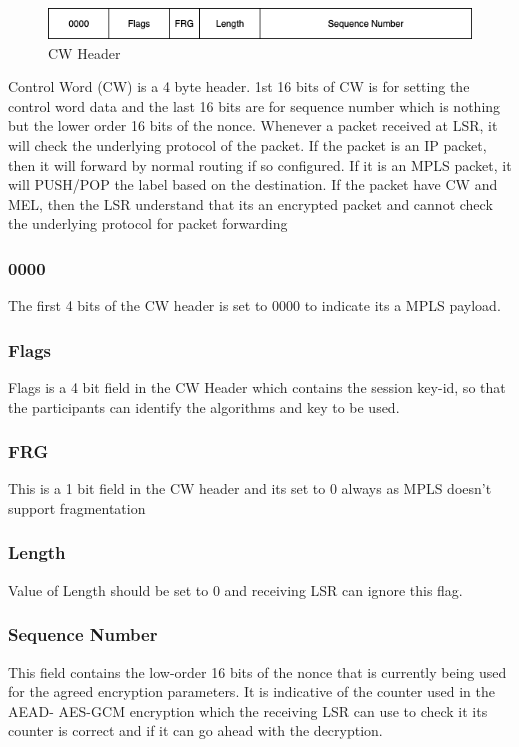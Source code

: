 \begin{figure}
       \centering\includegraphics[width=\textwidth]{Final/CW.png}
       \caption{CW Header}
       \label{fig:compbest}
\end{figure}


Control Word (CW) is a 4 byte header. 1st 16 bits of CW is for setting the control word data and the last 16 bits are for sequence number which is nothing but the lower order 16 bits of the nonce. Whenever a packet received at LSR, it will check the underlying protocol of the packet. If the packet is an IP packet, then it will forward by normal routing if so configured. If it is an MPLS packet, it will PUSH/POP the label based on the destination. If the packet have CW and MEL, then the LSR understand that its an encrypted packet and cannot check the underlying protocol for packet forwarding\\

\subsubsection{0000}
The first 4 bits of the CW header is set to 0000 to indicate its a MPLS payload.\\

\subsubsection{Flags} 
Flags is a 4 bit field in the CW Header which contains the session key-id, so that the participants can identify the algorithms and key to be used.\\


\subsubsection{FRG} 
This is a 1 bit field in the CW header and its set to 0 always as MPLS doesn’t support fragmentation\\ 

\subsubsection{Length}
Value of Length should be set to 0 and receiving LSR can ignore this flag.\\

\subsubsection{Sequence Number}
This field contains the low-order 16 bits of the nonce that is currently being used for the agreed encryption parameters. It is indicative of the counter used in the AEAD- AES-GCM encryption which the receiving LSR can use to check it its counter is correct and if it can go ahead with the decryption.\\

